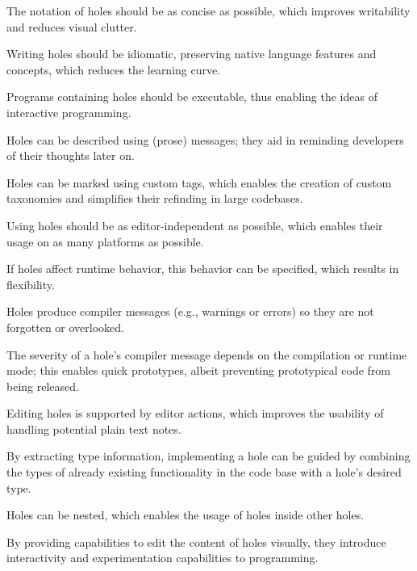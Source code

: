 \begin{properties}
    \item The notation of holes should be as concise as possible, which improves writability and reduces visual clutter.\label{hp:concise}
    \item Writing holes should be idiomatic, preserving native language features and concepts, which reduces the learning curve.\label{hp:idiomatic}
    \item Programs containing holes should be executable, thus enabling the ideas of interactive programming.\label{hp:executable}
    \item Holes can be described using (prose) messages; they aid in reminding developers of their thoughts later on.\label{hp:prose-message}
    \item Holes can be marked using custom tags, which enables the creation of custom taxonomies and simplifies their refinding in large codebases.\label{hp:taggable}
    \item Using holes should be as editor-independent as possible, which enables their usage on as many platforms as possible.\label{hp:editor-independence}
    \item If holes affect runtime behavior, this behavior can be specified, which results in flexibility.\label{hp:runtime-behavior}
    \item Holes produce compiler messages (e.g., warnings or errors) so they are not forgotten or overlooked.\label{hp:compile-warnings}
    \item The severity of a hole's compiler message depends on the compilation or runtime mode; this enables quick prototypes, albeit preventing prototypical code from being released.\label{hp:severity-modes}
    \item Editing holes is supported by editor actions, which improves the usability of handling potential plain text notes.\label{hp:supported-editor-actions}
    \item By extracting type information, implementing a hole can be guided by combining the types of already existing functionality in the code base with a hole's desired type.\label{hp:matchable-via-types}
    \item Holes can be nested, which enables the usage of holes inside other holes.\label{hp:nestable}
    \item By providing capabilities to edit the content of holes visually, they introduce interactivity and experimentation capabilities to programming.\label{hp:visually-editable}
\end{properties}
